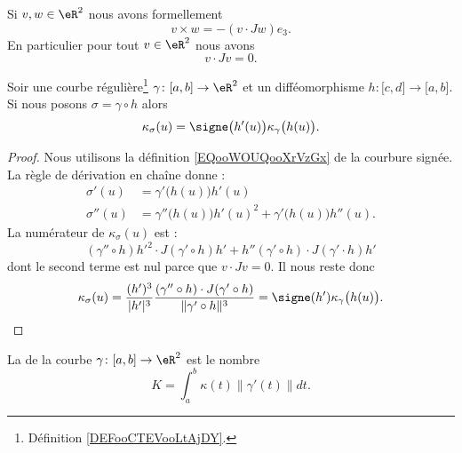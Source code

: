 Si \( v,w\in \eR^2\) nous avons formellement
\begin{equation}
    v\times w=-(v\cdot Jw)e_3.
\end{equation}
En particulier pour tout \( v\in \eR^2\) nous avons
\begin{equation}
    v\cdot Jv=0.
\end{equation}

\begin{lemma}
    Soir une courbe régulière\footnote{Définition \ref{DEFooCTEVooLtAjDY}.} \( \gamma\colon \mathopen[ a , b \mathclose]\to \eR^2\) et un difféomorphisme \( h\colon \mathopen[ c , d \mathclose]\to \mathopen[ a , b \mathclose]\). Si nous posons \( \sigma=\gamma\circ h\) alors
    \begin{equation}        \label{EQooSQNMooUKGhPd}
        \kappa_{\sigma}(u)=\signe\big( h'(u) \big)\kappa_{\gamma}\big( h(u) \big).
    \end{equation}
\end{lemma}

\begin{proof}
    Nous utilisons la définition \eqref{EQooWOUQooXrVzGx} de la courbure signée. La règle de dérivation en chaîne donne :
    \begin{subequations}
        \begin{align}
            \sigma'(u)&=\gamma'\big( h(u) \big)h'(u)\\
            \sigma''(u)&=\gamma''\big( h(u) \big)h'(u)^2+\gamma'\big( h(u) \big)h''(u).
        \end{align}
    \end{subequations}
    La numérateur de \( \kappa_{\sigma}(u)\) est :
    \begin{equation}
        (\gamma''\circ h)h'^2\cdot J(\gamma'\circ h)h'+h''(\gamma'\circ h)\cdot J(\gamma'\cdot h)h'
    \end{equation}
    dont le second terme est nul parce que \( v\cdot Jv=0\). Il nous reste donc
    \begin{equation}
        \kappa_{\sigma}(u)=\frac{ (h')^3 }{ | h' |^3} \frac{ (\gamma''\circ h)\cdot J(\gamma'\circ h) }{ \| \gamma'\circ h \|^3 }=\signe(h')\kappa_{\gamma}\big( h(u) \big).
    \end{equation}
\end{proof}

\begin{definition}
    La  de la courbe \( \gamma\colon \mathopen[ a , b \mathclose] \to \eR^2 \) est le nombre
    \begin{equation}        \label{EQooTIFWooQflOfd}
        K=\int_a^b\kappa(t)\| \gamma'(t) \|dt.
    \end{equation}
\end{definition}

